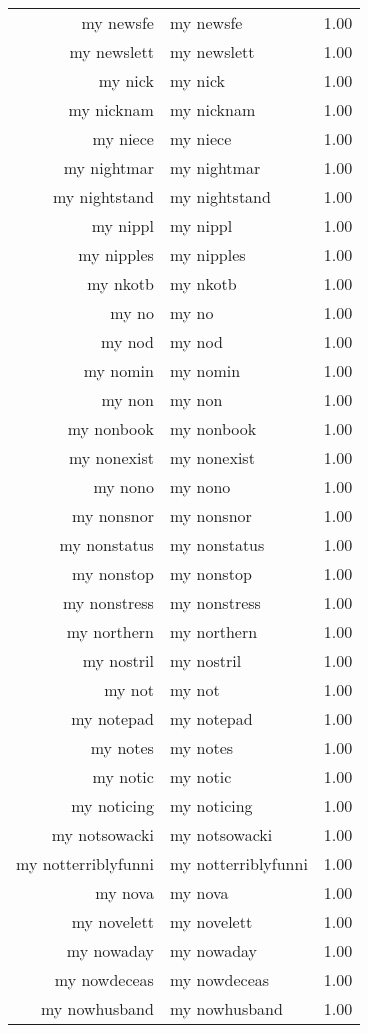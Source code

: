 \begin{table}[ht]
\begin{tabular}{rlr}
  my newsfe & my newsfe & 1.00 \\ 
  my newslett & my newslett & 1.00 \\ 
  my nick & my nick & 1.00 \\ 
  my nicknam & my nicknam & 1.00 \\ 
  my niece & my niece & 1.00 \\ 
  my nightmar & my nightmar & 1.00 \\ 
  my nightstand & my nightstand & 1.00 \\ 
  my nippl & my nippl & 1.00 \\ 
  my nipples & my nipples & 1.00 \\ 
  my nkotb & my nkotb & 1.00 \\ 
  my no & my no & 1.00 \\ 
  my nod & my nod & 1.00 \\ 
  my nomin & my nomin & 1.00 \\ 
  my non & my non & 1.00 \\ 
  my nonbook & my nonbook & 1.00 \\ 
  my nonexist & my nonexist & 1.00 \\ 
  my nono & my nono & 1.00 \\ 
  my nonsnor & my nonsnor & 1.00 \\ 
  my nonstatus & my nonstatus & 1.00 \\ 
  my nonstop & my nonstop & 1.00 \\ 
  my nonstress & my nonstress & 1.00 \\ 
  my northern & my northern & 1.00 \\ 
  my nostril & my nostril & 1.00 \\ 
  my not & my not & 1.00 \\ 
  my notepad & my notepad & 1.00 \\ 
  my notes & my notes & 1.00 \\ 
  my notic & my notic & 1.00 \\ 
  my noticing & my noticing & 1.00 \\ 
  my notsowacki & my notsowacki & 1.00 \\ 
  my notterriblyfunni & my notterriblyfunni & 1.00 \\ 
  my nova & my nova & 1.00 \\ 
  my novelett & my novelett & 1.00 \\ 
  my nowaday & my nowaday & 1.00 \\ 
  my nowdeceas & my nowdeceas & 1.00 \\ 
  my nowhusband & my nowhusband & 1.00 \\ 

\end{tabular}
\end{table}
